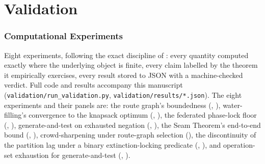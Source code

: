 \documentclass[11pt,twocolumn,a4paper]{article}
\theoremstyle{rdm}
\theoremstyle{definition}
\theoremstyle{remark}
\begin{document}
\part{Validation}
\label{part:validation}

\section{Computational Experiments}
\label{sec:validation}

Eight experiments, following the exact discipline of
\citet[\S{}Validation]{sachikonye-accountable-compilation}: every quantity
computed exactly where the underlying object is finite, every claim
labelled by the theorem it empirically exercises, every result stored to
JSON with a machine-checked verdict. Full code and results accompany this
manuscript (\texttt{validation/run\_validation.py},
\texttt{validation/results/*.json}). The eight experiments and their panels
are: the route graph's boundedness (,
), water-filling's convergence to the
knapsack optimum (,
), the federated phase-lock floor
(, ),
generate-and-test on exhausted negation (,
), the Seam Theorem's end-to-end bound
(, ), crowd-sharpening under
route-graph selection (), the discontinuity
of the partition lag under a binary extinction-locking predicate
(,
), and operation-set exhaustion for
generate-and-test (,
).
\end{document}
